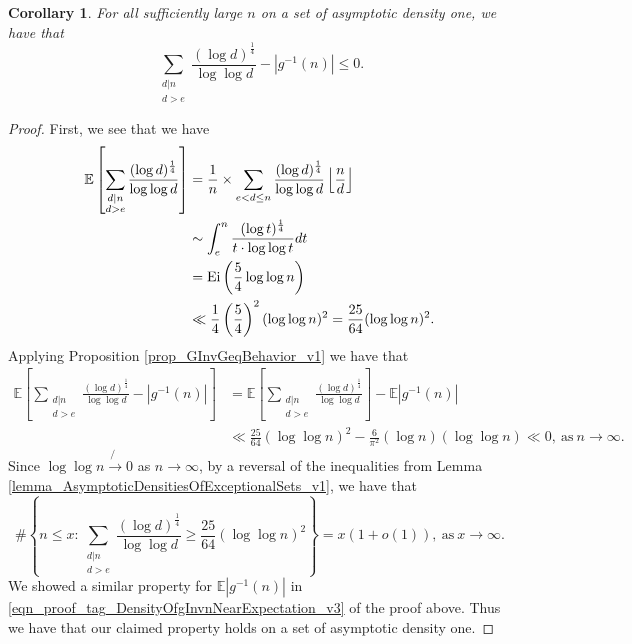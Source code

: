 \documentclass[11pt,reqno,a4letter]{article}
\numberwithin{figure}{section}
\numberwithin{table}{section}
\newcommand{\Floor}[2]{\ensuremath{\left\lfloor \frac{#1}{#2} \right\rfloor}}
\theoremstyle{plain}
\newtheorem{cor}[theorem]{Corollary}
\numberwithin{theorem}{section}
\theoremstyle{definition}
\begin{document}
\begin{cor} 
\label{cor_GInvGeqBehavior_v2} 
For all sufficiently large $n$ on a set of asymptotic density one, we have that 
\[
\sum_{\substack{d|n \\ d > e}} \frac{(\log d)^{\frac{1}{4}}}{\log\log d} - |g^{-1}(n)| \leq 0. 
\]
\end{cor} 
\begin{proof} 
First, we see that we have 
\begin{align} 
\notag 
\mathbb{E}\left[\sum_{\substack{d|n \\ d > e}} \frac{(\log d)^{\frac{1}{4}}}{\log\log d}\right] & = 
     \frac{1}{n} \times \sum_{e < d \leq n} \frac{(\log d)^{\frac{1}{4}}}{\log\log d} \Floor{n}{d} \\ 
\notag 
     & \sim \int_{e}^{n} \frac{(\log t)^{\frac{1}{4}}}{t \cdot \log\log t} dt \\ 
\notag 
     & = \operatorname{Ei}\left(\frac{5}{4} \log\log n\right) \\ 
\label{eqn_proof_tag_EKeyDivSum_v1} 
     & \ll \frac{1}{4} \left(\frac{5}{4}\right)^2 (\log\log n)^2 = \frac{25}{64} (\log\log n)^2. 
\end{align} 
Applying 
Proposition \ref{prop_GInvGeqBehavior_v1} we have that 
\begin{align*} 
\mathbb{E}\left[\sum_{\substack{d|n \\ d > e}} \frac{(\log d)^{\frac{1}{4}}}{\log\log d} - |g^{-1}(n)|\right] & = 
     \mathbb{E}\left[\sum_{\substack{d|n \\ d > e}} \frac{(\log d)^{\frac{1}{4}}}{\log\log d}\right] - 
     \mathbb{E}|g^{-1}(n)| \\ 
     & \ll 
     \frac{25}{64} (\log\log n)^2 - \frac{6}{\pi^2} (\log n) (\log\log n) \ll 0, 
     \mathrm{\ as\ } n \rightarrow \infty. 
\end{align*} 
Since $\log\log n \not{\rightarrow} 0$ as $n \rightarrow \infty$, by a reversal of the inequalities from 
Lemma \ref{lemma_AsymptoticDensitiesOfExceptionalSets_v1}, we have that 
\[
\#\left\{n \leq x: \sum_{\substack{d|n \\ d > e}} \frac{(\log d)^{\frac{1}{4}}}{\log\log d} \geq 
     \frac{25}{64} (\log\log n)^2\right\} = x(1+o(1)), \mathrm{\ as\ } x \rightarrow \infty. 
\]
We showed a similar property for $\mathbb{E}|g^{-1}(n)|$ in 
\eqref{eqn_proof_tag_DensityOfgInvnNearExpectation_v3} of the proof above. 
Thus we have that our claimed property holds on a set of asymptotic density one. 
\end{proof} 
\end{document}
